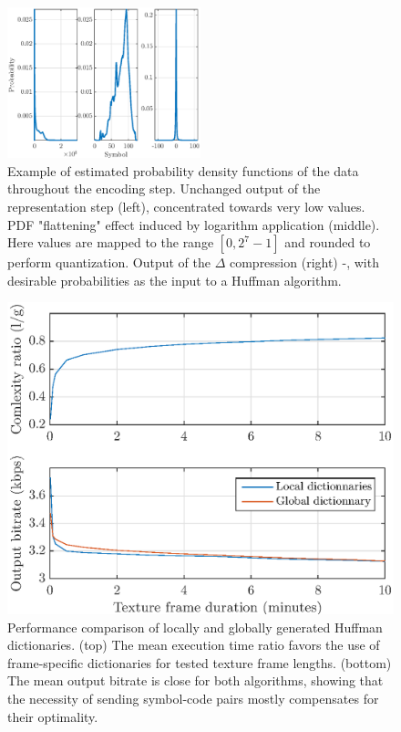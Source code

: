 \documentclass[final,3p,times,twocolumn]{elsarticle}
\begin{document}
\begin{figure}[htbp]
	\centering
		\includegraphics[width=0.5\textwidth]{figures/pdf.eps}
	\caption{Example of estimated probability density functions of the data throughout the encoding step. Unchanged output of the representation step (left), concentrated towards very low values. PDF "flattening" effect induced by logarithm application (middle). Here values are mapped to the range $[0, 2^7-1]$ and rounded to perform quantization. Output of the $\Delta$ compression (right) -, with desirable probabilities as the input to a Huffman algorithm.}
	\label{fig:pdf}
\end{figure}

\begin{figure}[htbp]
	\centering
		\includegraphics[width=\columnwidth]{figures/dict_comp.eps}
	\caption{Performance comparison of locally and globally generated Huffman dictionaries. (top) The mean execution time ratio favors the use of frame-specific dictionaries for tested texture frame lengths. (bottom) The mean output bitrate is close for both algorithms, showing that the necessity of sending symbol-code pairs mostly compensates for their optimality.}
	\label{fig:dict_comp}
\end{figure}
\end{document}
